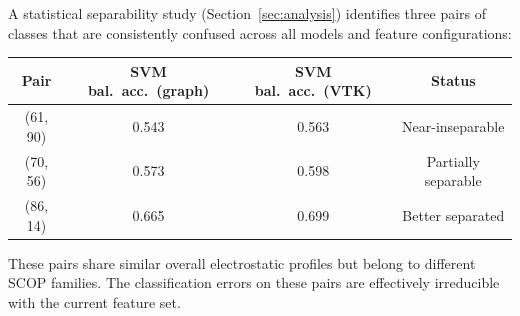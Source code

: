 A statistical separability study (Section~\ref{sec:analysis}) identifies three
pairs of classes that are consistently confused across all models and feature
configurations:

\begin{center}
  \begin{tabular}{cccc}
    \toprule
    \textbf{Pair} & \textbf{SVM bal.\ acc.\ (graph)} & \textbf{SVM bal.\ acc.\ (VTK)} & \textbf{Status} \\
    \midrule
    (61, 90) & 0.543 & 0.563 & Near-inseparable \\
    (70, 56) & 0.573 & 0.598 & Partially separable \\
    (86, 14) & 0.665 & 0.699 & Better separated \\
    \bottomrule
  \end{tabular}
\end{center}

These pairs share similar overall electrostatic profiles but belong to
different SCOP families. The classification errors on these pairs are
effectively irreducible with the current feature set.
